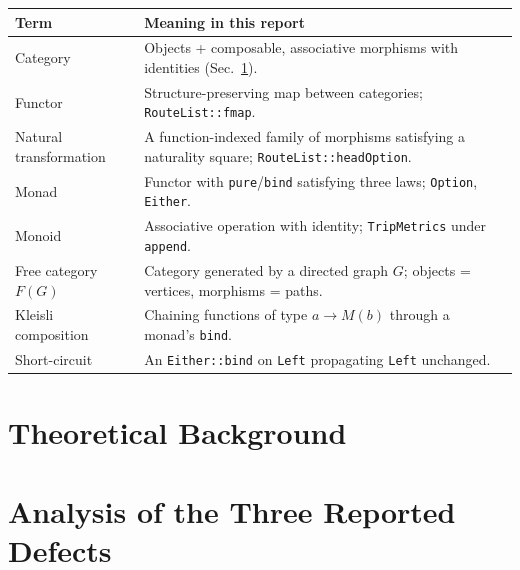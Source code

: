 \documentclass[a4paper,12pt,fleqn]{article}
\begin{document}

\tableofcontents

\begin{center}
\small
\begin{tabular}{|l|p{10cm}|}\hline
\textbf{Term} & \textbf{Meaning in this report} \\\hline
Category & Objects + composable, associative morphisms with identities (Sec.~\ref{sec:background}). \\\hline
Functor & Structure-preserving map between categories; \texttt{RouteList::fmap}. \\\hline
Natural transformation & A function-indexed family of morphisms satisfying a naturality square; \texttt{RouteList::headOption}. \\\hline
Monad & Functor with \texttt{pure}/\texttt{bind} satisfying three laws; \texttt{Option}, \texttt{Either}. \\\hline
Monoid & Associative operation with identity; \texttt{TripMetrics} under \texttt{append}. \\\hline
Free category $F(G)$ & Category generated by a directed graph $G$; objects = vertices, morphisms = paths. \\\hline
Kleisli composition & Chaining functions of type $a \to M(b)$ through a monad's \texttt{bind}. \\\hline
Short-circuit & An \texttt{Either::bind} on \texttt{Left} propagating \texttt{Left} unchanged. \\\hline
\end{tabular}
\end{center}





\newpage
\section{Theoretical Background}\label{sec:background}


\newpage
\section{Analysis of the Three Reported Defects}\label{sec:motivation}
\end{document}
